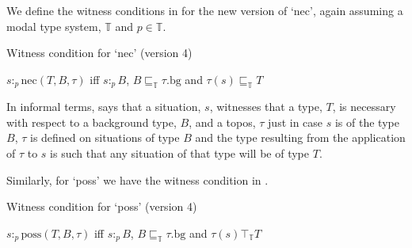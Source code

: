 We define the witness conditions in \nexteg{} for the new version of
`nec', again assuming a modal type system, $\mathbb{T}$ and
$p\in\mathbb{T}$.
\begin{ex}
  Witness condition for `nec' (version 4)

  $s:_p\mathrm{nec}(T,B,\tau)$ iff $s:_pB$, 
$B\sqsubseteq_{\mathbb{T}}\tau.\mathrm{bg}$ and 
$\tau(s)\sqsubseteq_{\mathbb{T}}T$
  
 


\label{ex:witness-conds-nec-topos}
\end{ex}
In informal terms, \preveg{} says that a situation, $s$, witnesses that a
type, $T$, is necessary with respect to a background type, $B$, and a
topos, $\tau$ just in case $s$ is of the type $B$, $\tau$ is defined
on situations of type $B$ and the type resulting from the application
of $\tau$ to $s$ is such that any situation of that type will be of
type $T$.

Similarly, for `poss' we have the witness condition in \nexteg{}.
\begin{ex}
  Witness condition for `poss' (version 4)

  $s:_p\mathrm{poss}(T,B,\tau)$ iff $s:_pB$, 
$B\sqsubseteq_{\mathbb{T}}\tau.\mathrm{bg}$ and 
$\tau(s)\top_{\mathbb{T}}T$
  


 
 
\label{ex:witness-conds-nec-poss-topos}   
\end{ex}



